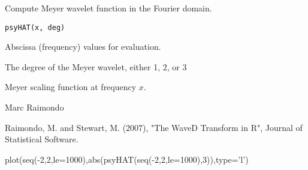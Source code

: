 \begin{Description}\relax
Compute Meyer wavelet function in the Fourier domain.
\end{Description}
\begin{Usage}
\begin{verbatim}
psyHAT(x, deg)
\end{verbatim}
\end{Usage}
\begin{Arguments}
\begin{ldescription}
\item[\code{x}] Abscissa (frequency) values for  evaluation.
\item[\code{deg}] The degree of the Meyer wavelet, either 1, 2, or 3 
\end{ldescription}
\end{Arguments}
\begin{Value}
Meyer scaling function at frequency $x$.
\end{Value}
\begin{Author}\relax
Marc Raimondo
\end{Author}
\begin{References}\relax
Raimondo, M. and Stewart, M. (2007),
"The WaveD Transform in R", Journal of Statistical Software.
\end{References}
\begin{SeeAlso}\relax
{}
\end{SeeAlso}
\begin{Examples}
\begin{ExampleCode}
plot(seq(-2,2,le=1000),abs(psyHAT(seq(-2,2,le=1000),3)),type='l')

\end{ExampleCode}
\end{Examples}


